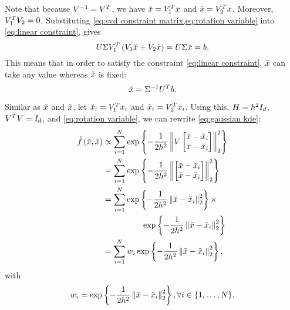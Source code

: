 Note that because $V^{-1} = V^T$, we have $\breve{x} = V_1^T x$ and $\tilde{x} = V_2^T x$.
\cstarta Moreover, $V_1^T V_2 = 0$. \cenda
Substituting \cref{eq:svd constraint matrix,eq:rotation variable} into \cref{eq:linear constraint}, gives
\begin{equation}
	\label{eq:linear constraint after rotation}
	U \Sigma V_1^T \left( V_1 \breve{x} + V_2 \tilde{x} \right)
	= U \Sigma \breve{x} = b.
\end{equation}
This means that in order to satisfy the constraint \cref{eq:linear constraint}, $\tilde{x}$ can take any value whereas $\breve{x}$ is fixed:
\begin{equation}
	\label{eq:fixed part}
	\breve{x} = \Sigma^{-1} U^T b.
\end{equation}

Similar as $\breve{x}$ and $\tilde{x}$, let $\breve{x}_{i}=V_1^T x_{i}$ and $\tilde{x}_{i}=V_2^T x_{i}$. Using this, $H=h^2 I_{d}$, \cstarta $V^TV=I_{d}$, \cenda and \cref{eq:rotation variable}, we can rewrite \cref{eq:gaussian kde}:
\begin{align*}
	\densityest{\variableconstrained, \variableunconstrained} 
	&\propto \sum_{\indexdata=1}^{\numberofsamples}
	\e{ -\frac{1}{2\bandwidth^2}
		\normtwo{ V \begin{bmatrix} 
			\variableconstrained - \datapointconstrained{\indexdata} \\ 
			\variableunconstrained - \datapointunconstrained{\indexdata}
		\end{bmatrix}}^2
	} \\
	&= \sum_{\indexdata=1}^{\numberofsamples}
	\e{ -\frac{1}{2\bandwidth^2}
		\normtwo{ \begin{bmatrix} 
			\variableconstrained - \datapointconstrained{\indexdata} \\ 
			\variableunconstrained - \datapointunconstrained{\indexdata}
		\end{bmatrix}}^2
	} \\
	&=\sum_{\indexdata=1}^{\numberofsamples}
	\e{ -\frac{1}{2\bandwidth^2} \normtwo{ \variableconstrained - \datapointconstrained{\indexdata} }^2} \times \\
	&\superquad \e{ -\frac{1}{2\bandwidth^2} \normtwo{ \variableunconstrained - \datapointunconstrained{\indexdata} }^2} \\
	&=\sum_{\indexdata=1}^{\numberofsamples}
	\weight{\indexdata} \e{ -\frac{1}{2\bandwidth^2} \normtwo{ \variableunconstrained - \datapointunconstrained{\indexdata} }^2},
\end{align*}
with
\begin{equation}
	\label{eq:weights constrained simple}
	w_{i} = \exp\left\{  -\frac{1}{2h^2} \left\Vert  \breve{x} - \breve{x}_{i}  \right\Vert_2^2 \right\},
	\forall i \in \{1,\ldots,N\}.
\end{equation}

